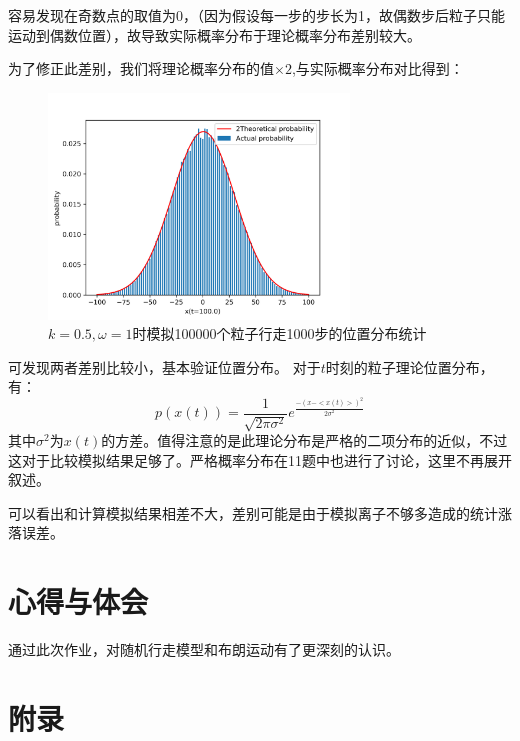 \documentclass[a4paper,11pt]{article}
\begin{document}
容易发现在奇数点的取值为0，（因为假设每一步的步长为1，故偶数步后粒子只能运动到偶数位置），故导致实际概率分布于理论概率分布差别较大。

为了修正此差别，我们将理论概率分布的值$\times 2$,与实际概率分布对比得到：
\begin{figure}[!htbp]   
\centering
\includegraphics[bb= 0 0 450 370,width=8cm] {p-2.png}
\caption{$k=0.5,\omega=1$时模拟100000个粒子行走1000步的位置分布统计}      
\end{figure}

\newpage 可发现两者差别比较小，基本验证位置分布。
对于$t$时刻的粒子理论位置分布，有：
\begin{equation}
	p(x(t)) = \frac{1}{\sqrt{2\pi \sigma^{2}}}e^{\frac{-(x-<x(t)>)^{2}}{2\sigma^{2}}}
\end{equation}
其中$\sigma^{2}$为$x(t)$的方差。值得注意的是此理论分布是严格的二项分布的近似，不过这对于比较模拟结果足够了。严格概率分布在11题中也进行了讨论，这里不再展开叙述。
 
 
 
可以看出和计算模拟结果相差不大，差别可能是由于模拟离子不够多造成的统计涨落误差。


\section{心得与体会}
通过此次作业，对随机行走模型和布朗运动有了更深刻的认识。


\newpage
\section{附录}
\end{document}
